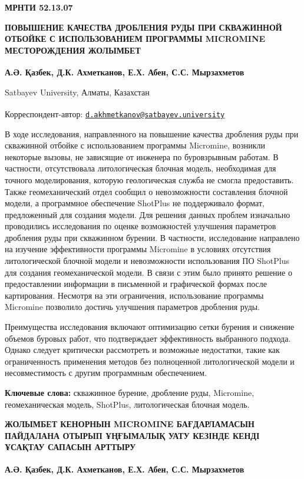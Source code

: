 
\newpage
{\bfseries МРНТИ 52.13.07}

{\bfseries ПОВЫШЕНИЕ КАЧЕСТВА ДРОБЛЕНИЯ РУДЫ ПРИ СКВАЖИННОЙ ОТБОЙКЕ С
ИСПОЛЬЗОВАНИЕМ ПРОГРАММЫ MICROMINE МЕСТОРОЖДЕНИЯ ЖОЛЫМБЕТ}

{\bfseries А.Ә. Қазбек, Д.К. Ахметканов\textsuperscript{\envelope }, Е.Х. Абен, С.С.
Мырзахметов}

Satbayev University, Алматы, Казахстан

{\bfseries \textsuperscript{\envelope }}Корреспондент-автор:
\href{mailto:d.akhmetkanov@satbayev.university}{\nolinkurl{d.akhmetkanov@satbayev.university}}

В ходе исследования, направленного на повышение качества дробления руды
при скважинной отбойке с использованием программы Micromine, возникли
некоторые вызовы, не зависящие от инженера по буровзрывным работам. В
частности, отсутствовала литологическая блочная модель, необходимая для
точного моделирования, которую геологическая служба не смогла
предоставить. Также геомеханический отдел сообщил о невозможности
составления блочной модели, а программное обеспечение ShotPlus не
поддерживало формат, предложенный для создания модели. Для решения
данных проблем изначально проводились исследования по оценке
возможностей улучшения параметров дробления руды при скважинном бурении.
В частности, исследование направлено на изучение эффективности программы
Micromine в условиях отсутствия литологической блочной модели и
невозможности использования ПО ShotPlus для создания геомеханической
модели. В связи с этим было принято решение о предоставлении информации
в письменной и графической формах после картирования. Несмотря на эти
ограничения, использование программы Micromine позволило достичь
улучшения параметров дробления руды.

Преимущества исследования включают оптимизацию сетки бурения и снижение
объемов буровых работ, что подтверждает эффективность выбранного
подхода. Однако следует критически рассмотреть и возможные недостатки,
такие как ограниченность применения методов без полноценной
литологической модели и несовместимость с другим программным
обеспечением.

{\bfseries Ключевые слова:} скважинное бурение, дробление руды, Micromine,
геомеханическая модель, ShotPlus, литологическая блочная модель.

{\bfseries ЖОЛЫМБЕТ КЕНОРНЫН MICROMINE БАҒДАРЛАМАСЫН ПАЙДАЛАНА ОТЫРЫП
ҰҢҒЫМАЛЫҚ УАТУ КЕЗІНДЕ КЕНДІ ҰСАҚТАУ САПАСЫН АРТТЫРУ}

{\bfseries А.Ә. Қазбек, Д.К. Ахметканов\textsuperscript{\envelope }, Е.Х. Абен, С.С.
Мырзахметов}

